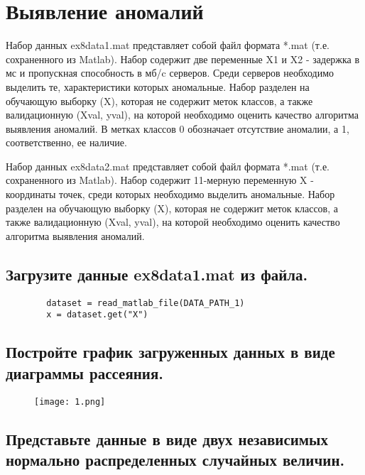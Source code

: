 







\section{Выявление аномалий}
\label{sec:purpose}

Набор данных ex8data1.mat представляет собой файл формата *.mat (т.е. сохраненного из Matlab). Набор содержит две переменные X1 и X2 - задержка в мс и пропускная способность в мб/c серверов. Среди серверов необходимо выделить те, характеристики которых аномальные. Набор разделен на обучающую выборку (X), которая не содержит меток классов, а также валидационную (Xval, yval), на которой необходимо оценить качество алгоритма выявления аномалий. В метках классов 0 обозначает отсутствие аномалии, а 1, соответственно, ее наличие.

Набор данных ex8data2.mat представляет собой файл формата *.mat (т.е. сохраненного из Matlab). Набор содержит 11-мерную переменную X - координаты точек, среди которых необходимо выделить аномальные. Набор разделен на обучающую выборку (X), которая не содержит меток классов, а также валидационную (Xval, yval), на которой необходимо оценить качество алгоритма выявления аномалий.


\subsection{Загрузите данные ex8data1.mat из файла.}

\begin{lstlisting}
        dataset = read_matlab_file(DATA_PATH_1)
        x = dataset.get("X")
\end{lstlisting}

\subsection{Постройте график загруженных данных в виде диаграммы рассеяния.}

\begin{figure}[h]
\centering
    \texttt{[image: 1.png]}
  \label{sec:purpose:payings}
\end{figure}

\subsection{Представьте данные в виде двух независимых нормально распределенных случайных величин.}

